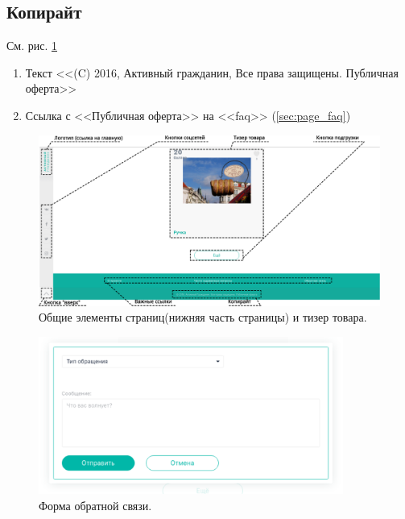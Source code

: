         \subsection{Копирайт}
            \label{sec:baseitems_footer_copiright}
            См. рис. \ref{fig:common_items_2}

            \begin{enumerate}
                \item Текст <<(C) 2016, Активный гражданин, Все права 
                    защищены. Публичная оферта>>
                \item Ссылка с <<Публичная оферта>> на <<faq>> 
                    (\ref{sec:page_faq})
            \end{enumerate}

        \begin{figure}
            \includegraphics[width=170mm]{02_noauth_funcs/figures/03r.eps}
            \caption{Общие элементы страниц(нижняя часть страницы) и тизер 
                товара.}
            \label{fig:common_items_2}
        \end{figure}
        \begin{figure}[h]
            \center
            \includegraphics[width=100mm]{02_noauth_funcs/figures/04.eps}
            \caption{Форма обратной связи.}
            \label{fig:common_items_3}
        \end{figure}

